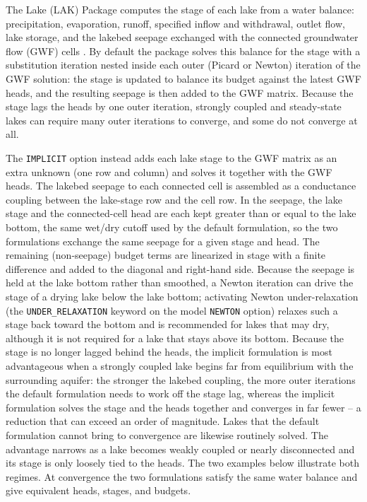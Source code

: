The Lake (LAK) Package computes the stage of each lake from a water balance: precipitation, evaporation, runoff, specified inflow and withdrawal, outlet flow, lake storage, and the lakebed seepage exchanged with the connected groundwater flow (GWF) cells \citep[\S 8]{modflow6gwf}. By default the package solves this balance for the stage with a substitution iteration nested inside each outer (Picard or Newton) iteration of the GWF solution: the stage is updated to balance its budget against the latest GWF heads, and the resulting seepage is then added to the GWF matrix. Because the stage lags the heads by one outer iteration, strongly coupled and steady-state lakes can require many outer iterations to converge, and some do not converge at all.

The \texttt{IMPLICIT} option instead adds each lake stage to the GWF matrix as an extra unknown (one row and column) and solves it together with the GWF heads. The lakebed seepage to each connected cell is assembled as a conductance coupling between the lake-stage row and the cell row. In the seepage, the lake stage and the connected-cell head are each kept greater than or equal to the lake bottom, the same wet/dry cutoff used by the default formulation, so the two formulations exchange the same seepage for a given stage and head. The remaining (non-seepage) budget terms are linearized in stage with a finite difference and added to the diagonal and right-hand side. Because the seepage is held at the lake bottom rather than smoothed, a Newton iteration can drive the stage of a drying lake below the lake bottom; activating Newton under-relaxation (the \texttt{UNDER\_RELAXATION} keyword on the model \texttt{NEWTON} option) relaxes such a stage back toward the bottom and is recommended for lakes that may dry, although it is not required for a lake that stays above its bottom. Because the stage is no longer lagged behind the heads, the implicit formulation is most advantageous when a strongly coupled lake begins far from equilibrium with the surrounding aquifer: the stronger the lakebed coupling, the more outer iterations the default formulation needs to work off the stage lag, whereas the implicit formulation solves the stage and the heads together and converges in far fewer -- a reduction that can exceed an order of magnitude. Lakes that the default formulation cannot bring to convergence are likewise routinely solved. The advantage narrows as a lake becomes weakly coupled or nearly disconnected and its stage is only loosely tied to the heads. The two examples below illustrate both regimes. At convergence the two formulations satisfy the same water balance and give equivalent heads, stages, and budgets.

